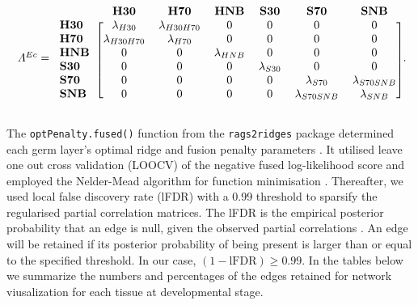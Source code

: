 \documentclass[
	a4paper, %
	10pt, %
	unnumberedsections, %
	twoside, %
]{LTJournalArticle}
\begin{document}
\[
\resizebox{\columnwidth}{!}{
	$\varLambda^{Ec} = 
    \begin{blockarray}{l*{6}{c}}
     & \mathbf{H30} & \mathbf{H70} & \mathbf{HNB} & \mathbf{S30} & \mathbf{S70} & \mathbf{SNB} \\
    \begin{block}{l[cccccc]}
    \mathbf{H30} & \lambda_{H30} & \lambda_{H30H70} & 0 & 0 & 0 & 0 \\
    \mathbf{H70} & \lambda_{H30H70} & \lambda_{H70} & 0 & 0 & 0 & 0 \\
    \mathbf{HNB} & 0 & 0 & \lambda_{HNB} & 0 & 0 & 0 \\
    \mathbf{S30} & 0 & 0 & 0 & \lambda_{S30} & 0 & 0 \\
    \mathbf{S70} & 0 & 0 & 0 & 0 & \lambda_{S70} & \lambda_{S70SNB} \\
    \mathbf{SNB} & 0 & 0 & 0 & 0 & \lambda_{S70SNB} & \lambda_{SNB} \\
    \end{block}
    \end{blockarray}$}.
\]

\noindent The \texttt{optPenalty.fused()} function from the \texttt{rags2ridges}
package determined each 
germ layer's optimal ridge and fusion penalty parameters \autocite{peeters2022a}. It utilised 
leave one out cross validation (LOOCV) of the negative fused 
log-likelihood score and employed the Nelder-Mead 
algorithm for function minimisation \autocite{nelder1965a}. Thereafter,
we used local false discovery rate (lFDR) with a 0.99 threshold
to sparsify the regularised partial correlation matrices. The lFDR
is the empirical posterior probability that an edge is null, given the observed 
partial correlations \autocite{peeters2022a}. An edge will be retained if its posterior probability 
of being present is larger than or equal to the
specified threshold. In our case, $(1 - \text{lFDR}) \geq 0.99$.
In the tables below we summarize the numbers and percentages of the
edges retained for network viusalization for each tissue at developmental stage.

\begin{table}[htbp]
    \centering
    \caption{Number and percentage of edges retained for 
	each tissue at developmental stage originating from endoderm.}
    \label{tab:edges_endoderm}
\end{table}
\end{document}
